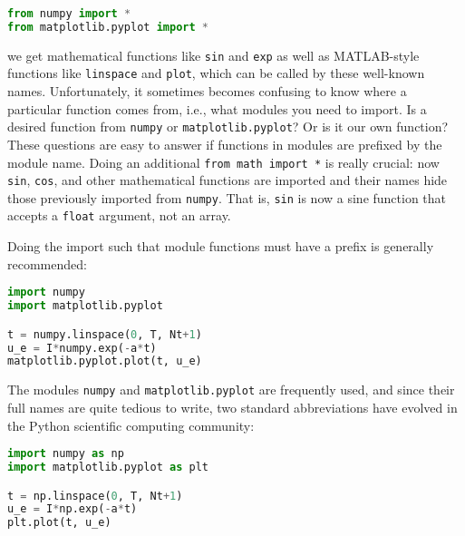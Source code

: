 \documentclass[graybox,sectrefs,envcountresetchap,open=right,final]{svmonodo}
\begin{document}
\begin{lstlisting}[language=python,style=blue1_bluegreen]
from numpy import *
from matplotlib.pyplot import *

\end{lstlisting}

we get mathematical functions like \texttt{sin} and \texttt{exp} as well as
MATLAB-style functions like \texttt{linspace} and \texttt{plot}, which can be called
by these well-known names.  Unfortunately, it sometimes becomes
confusing to know where a particular function comes from, i.e., what
modules you need to import. Is a desired function from \texttt{numpy} or
\texttt{matplotlib.pyplot}? Or is it our own function?  These questions are
easy to answer if functions in modules are prefixed by the module
name. Doing an additional \texttt{from math import *} is really crucial: now
\texttt{sin}, \texttt{cos}, and other mathematical functions are imported and their
names hide those previously imported from \texttt{numpy}.  That is, \texttt{sin} is
now a sine function that accepts a \texttt{float} argument, not an array.

Doing the import such that module functions must have a prefix
is generally recommended:








\begin{lstlisting}[language=python,style=blue1_bluegreen]
import numpy
import matplotlib.pyplot

t = numpy.linspace(0, T, Nt+1)
u_e = I*numpy.exp(-a*t)
matplotlib.pyplot.plot(t, u_e)

\end{lstlisting}


The modules \texttt{numpy} and \texttt{matplotlib.pyplot} are frequently used,
and since their full names are quite tedious to write,
two standard abbreviations
have evolved in the Python scientific computing community:








\begin{lstlisting}[language=python,style=blue1_bluegreen]
import numpy as np
import matplotlib.pyplot as plt

t = np.linspace(0, T, Nt+1)
u_e = I*np.exp(-a*t)
plt.plot(t, u_e)

\end{lstlisting}
\end{document}
